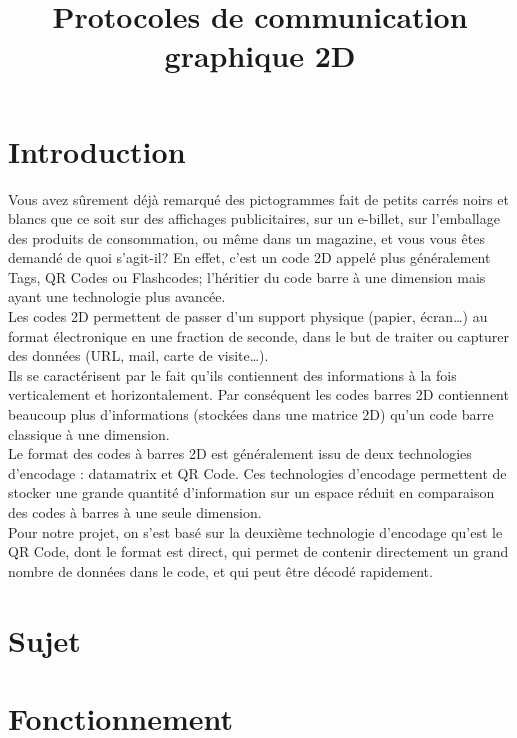 \documentclass{article}
\title{Protocoles de communication graphique 2D}
\date{}
\begin{document}
\maketitle
\part*{Introduction}
Vous avez sûrement déjà remarqué des pictogrammes fait de petits carrés noirs et blancs que ce soit sur des affichages publicitaires, sur un e-billet, sur l’emballage des produits de consommation, ou même dans un magazine, et vous vous êtes demandé de quoi s’agit-il? En effet, c’est un code 2D appelé plus généralement Tags, QR Codes ou Flashcodes; l'héritier du code barre à une dimension mais ayant une technologie plus avancée.\\

Les codes 2D permettent de passer d'un support physique (papier, écran…) au format électronique en une fraction de seconde, dans le but de traiter ou capturer des données (URL, mail, carte de visite…).\\

Ils se caractérisent par le fait qu'ils contiennent des informations à la fois verticalement et horizontalement. Par conséquent les codes barres 2D contiennent beaucoup plus d'informations (stockées dans une matrice 2D) qu'un code barre classique à une dimension.\\

 
Le format des codes à barres 2D est généralement issu de deux technologies d'encodage : datamatrix et QR Code. Ces technologies d'encodage permettent de stocker une grande quantité d'information sur un espace réduit en comparaison des codes à barres à une seule dimension. \\

Pour notre projet, on s'est basé sur la deuxième technologie d'encodage qu'est le QR Code, dont le format est direct, qui permet de contenir directement un grand nombre de données dans le code, et qui peut être décodé rapidement.


\part*{Sujet}

\part{Fonctionnement}
\end{document}
